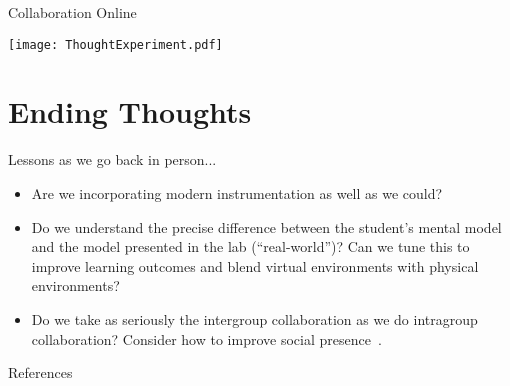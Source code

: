 \documentclass{beamer}
\begin{document}
\begin{frame}{Collaboration Online}
  \begin{center}
    \texttt{[image: ThoughtExperiment.pdf]}
  \end{center}
\end{frame}

\section{Ending Thoughts}

\begin{frame}{Lessons as we go back in person...}
  \begin{itemize}
    \item{
      Are we incorporating modern instrumentation as well as we could?
    }
    \pause
    \item{
      Do we understand the precise difference between the student's mental model and the model presented in the lab (``real-world'')?
      Can we tune this to improve learning outcomes and blend virtual environments with physical environments?~\cite{Bumbacher2017,Olympiou2011}
    }
    \pause
    \item{
      Do we take as seriously the intergroup collaboration as we do intragroup collaboration? 
      Consider how to improve social presence~\cite{Fiock2020}.
    }
  \end{itemize}
\end{frame}

\renewcommand*{\bibfont}{\tiny}
\begin{frame}{References}{}
\printbibliography
\end{frame}
\end{document}
